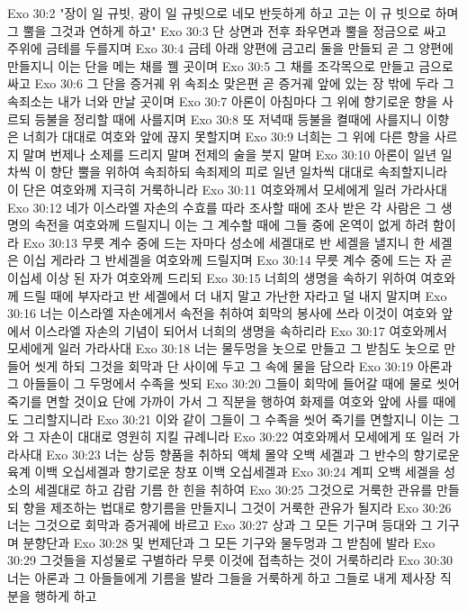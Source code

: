 Exo 30:2  "장이 일 규빗, 광이 일 규빗으로 네모 반듯하게 하고 고는 이 규 빗으로 하며 그 뿔을 그것과 연하게 하고"
Exo 30:3  단 상면과 전후 좌우면과 뿔을 정금으로 싸고 주위에 금테를 두를지며
Exo 30:4  금테 아래 양편에 금고리 둘을 만들되 곧 그 양편에 만들지니 이는 단을 메는 채를 꿸 곳이며
Exo 30:5  그 채를 조각목으로 만들고 금으로 싸고
Exo 30:6  그 단을 증거궤 위 속죄소 맞은편 곧 증거궤 앞에 있는 장 밖에 두라 그 속죄소는 내가 너와 만날 곳이며
Exo 30:7  아론이 아침마다 그 위에 향기로운 향을 사르되 등불을 정리할 때에 사를지며
Exo 30:8  또 저녁때 등불을 켤때에 사를지니 이향은 너희가 대대로 여호와 앞에 끊지 못할지며
Exo 30:9  너희는 그 위에 다른 향을 사르지 말며 번제나 소제를 드리지 말며 전제의 술을 붓지 말며
Exo 30:10  아론이 일년 일차씩 이 향단 뿔을 위하여 속죄하되 속죄제의 피로 일년 일차씩 대대로 속죄할지니라 이 단은 여호와께 지극히 거룩하니라
Exo 30:11  여호와께서 모세에게 일러 가라사대
Exo 30:12  네가 이스라엘 자손의 수효를 따라 조사할 때에 조사 받은 각 사람은 그 생명의 속전을 여호와께 드릴지니 이는 그 계수할 때에 그들 중에 온역이 없게 하려 함이라
Exo 30:13  무릇 계수 중에 드는 자마다 성소에 세겔대로 반 세겔을 낼지니 한 세겔은 이십 게라라 그 반세겔을 여호와께 드릴지며
Exo 30:14  무릇 계수 중에 드는 자 곧 이십세 이상 된 자가 여호와께 드리되
Exo 30:15  너희의 생명을 속하기 위하여 여호와께 드릴 때에 부자라고 반 세겔에서 더 내지 말고 가난한 자라고 덜 내지 말지며
Exo 30:16  너는 이스라엘 자손에게서 속전을 취하여 회막의 봉사에 쓰라 이것이 여호와 앞에서 이스라엘 자손의 기념이 되어서 너희의 생명을 속하리라
Exo 30:17  여호와께서 모세에게 일러 가라사대
Exo 30:18  너는 물두멍을 놋으로 만들고 그 받침도 놋으로 만들어 씻게 하되 그것을 회막과 단 사이에 두고 그 속에 물을 담으라
Exo 30:19  아론과 그 아들들이 그 두멍에서 수족을 씻되
Exo 30:20  그들이 회막에 들어갈 때에 물로 씻어 죽기를 면할 것이요 단에 가까이 가서 그 직분을 행하여 화제를 여호와 앞에 사를 때에도 그리할지니라
Exo 30:21  이와 같이 그들이 그 수족을 씻어 죽기를 면할지니 이는 그와 그 자손이 대대로 영원히 지킬 규례니라
Exo 30:22  여호와께서 모세에게 또 일러 가라사대
Exo 30:23  너는 상등 향품을 취하되 액체 몰약 오백 세겔과 그 반수의 향기로운 육계 이백 오십세겔과 향기로운 창포 이백 오십세겔과
Exo 30:24  계피 오백 세겔을 성소의 세겔대로 하고 감람 기름 한 힌을 취하여
Exo 30:25  그것으로 거룩한 관유를 만들되 향을 제조하는 법대로 향기름을 만들지니 그것이 거룩한 관유가 될지라
Exo 30:26  너는 그것으로 회막과 증거궤에 바르고
Exo 30:27  상과 그 모든 기구며 등대와 그 기구며 분향단과
Exo 30:28  및 번제단과 그 모든 기구와 물두멍과 그 받침에 발라
Exo 30:29  그것들을 지성물로 구별하라 무릇 이것에 접촉하는 것이 거룩하리라
Exo 30:30  너는 아론과 그 아들들에게 기름을 발라 그들을 거룩하게 하고 그들로 내게 제사장 직분을 행하게 하고
